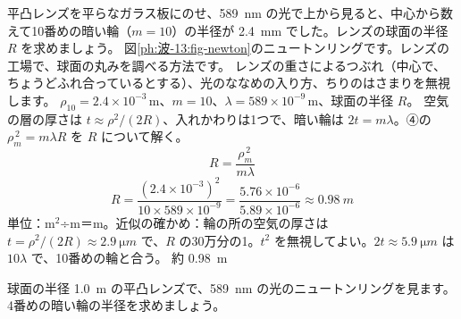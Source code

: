 \begin{phreidai}[ニュートンリングでレンズの丸みをはかる]
\label{ph:波-13:ex8}平凸レンズを平らなガラス板にのせ、\qty{589}{nm} の光で上から見ると、中心から数えて10番めの暗い輪（$m=10$）の半径が \qty{2.4}{mm} でした。レンズの球面の半径 $R$ を求めましょう。
\phbamen
図\ref{ph:波-13:fig-newton}のニュートンリングです。レンズの工場で、球面の丸みを調べる方法です。
\phmushi
レンズの重さによるつぶれ（中心で、ちょうどふれ合っているとする）、光のななめの入り方、ちりのはさまりを無視します。
\phzu
$\rho_{10}=2.4\times10^{-3}$\,m、$m=10$、$\lambda=589\times10^{-9}$\,m、球面の半径 $R$。
\phriyu
空気の層の厚さは $t\approx\rho^2/(2R)$、入れかわりは1つで、暗い輪は $2t=m\lambda$。④の $\rho_m^{\,2}=m\lambda R$ を $R$ について解く。
\phtateru
\[ R=\frac{\rho_m^{\,2}}{m\lambda} \]
\phtoku
\[ R=\frac{(2.4\times10^{-3})^2}{10\times589\times10^{-9}}=\frac{5.76\times10^{-6}}{5.89\times10^{-6}}\approx\qty{0.98}{m} \]
\phtashikame
単位：m$^2$÷m＝m。近似の確かめ：輪の所の空気の厚さは $t=\rho^2/(2R)\approx\qty{2.9}{\micro m}$ で、$R$ の30万分の1。$t^2$ を無視してよい。$2t\approx\qty{5.9}{\micro m}$ は $10\lambda$ で、10番めの輪と合う。
\kotae 約 \qty{0.98}{m}
\end{phreidai}
\begin{jibun}
球面の半径 \qty{1.0}{m} の平凸レンズで、\qty{589}{nm} の光のニュートンリングを見ます。4番めの暗い輪の半径を求めましょう。
\end{jibun}

